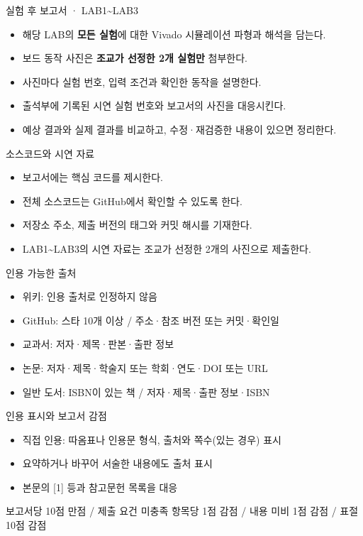 \documentclass[aspectratio=169,11pt,t]{beamer}
\begin{document}
\begin{frame}{실험 후 보고서 · LAB1\textasciitilde{}LAB3}
\begin{itemize}
\item 해당 LAB의 \textbf{모든 실험}에 대한 Vivado 시뮬레이션 파형과 해석을 담는다.
\item 보드 동작 사진은 \textbf{조교가 선정한 2개 실험만} 첨부한다.
\item 사진마다 실험 번호, 입력 조건과 확인한 동작을 설명한다.
\item 출석부에 기록된 시연 실험 번호와 보고서의 사진을 대응시킨다.
\item 예상 결과와 실제 결과를 비교하고, 수정·재검증한 내용이 있으면 정리한다.
\end{itemize}
\end{frame}

\begin{frame}{소스코드와 시연 자료}
\begin{itemize}
\item 보고서에는 핵심 코드를 제시한다.
\item 전체 소스코드는 GitHub에서 확인할 수 있도록 한다.
\item 저장소 주소, 제출 버전의 태그와 커밋 해시를 기재한다.
\item LAB1\textasciitilde{}LAB3의 시연 자료는 조교가 선정한 2개의 사진으로 제출한다.
\end{itemize}
\end{frame}

\begin{frame}{인용 가능한 출처}
\begin{itemize}
\item 위키: 인용 출처로 인정하지 않음
\item GitHub: 스타 10개 이상 / 주소·참조 버전 또는 커밋·확인일
\item 교과서: 저자·제목·판본·출판 정보
\item 논문: 저자·제목·학술지 또는 학회·연도·DOI 또는 URL
\item 일반 도서: ISBN이 있는 책 / 저자·제목·출판 정보·ISBN
\end{itemize}
\end{frame}

\begin{frame}{인용 표시와 보고서 감점}
\begin{itemize}
\item 직접 인용: 따옴표나 인용문 형식, 출처와 쪽수(있는 경우) 표시
\item 요약하거나 바꾸어 서술한 내용에도 출처 표시
\item 본문의 [1] 등과 참고문헌 목록을 대응
\end{itemize}
\vspace{0.35cm}
보고서당 10점 만점 / 제출 요건 미충족 항목당 1점 감점 / 내용 미비 1점 감점 / 표절 10점 감점
\end{frame}
\end{document}
